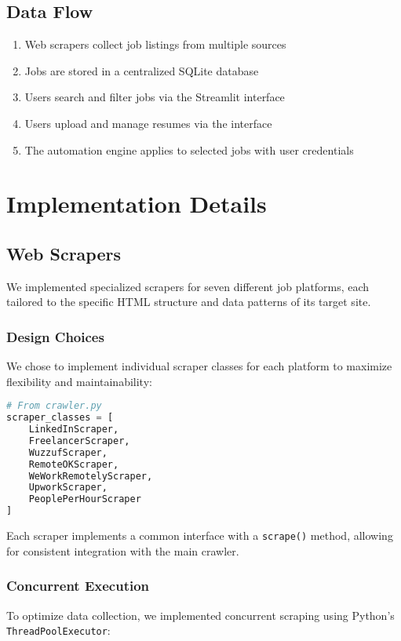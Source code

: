 \documentclass[12pt,a4paper]{report}
\begin{document}
\section{Data Flow}
\begin{enumerate}
    \item Web scrapers collect job listings from multiple sources
    \item Jobs are stored in a centralized SQLite database
    \item Users search and filter jobs via the Streamlit interface
    \item Users upload and manage resumes via the interface
    \item The automation engine applies to selected jobs with user credentials
\end{enumerate}

\chapter{Implementation Details}

\section{Web Scrapers}
We implemented specialized scrapers for seven different job platforms, each tailored to the specific HTML structure and data patterns of its target site.

\subsection{Design Choices}
We chose to implement individual scraper classes for each platform to maximize flexibility and maintainability:

\begin{lstlisting}[language=Python, caption=Scraper Class Structure]
# From crawler.py
scraper_classes = [
    LinkedInScraper,
    FreelancerScraper,
    WuzzufScraper,
    RemoteOKScraper,
    WeWorkRemotelyScraper,
    UpworkScraper,
    PeoplePerHourScraper
]
\end{lstlisting}

Each scraper implements a common interface with a \texttt{scrape()} method, allowing for consistent integration with the main crawler.

\subsection{Concurrent Execution}
To optimize data collection, we implemented concurrent scraping using Python's \texttt{ThreadPoolExecutor}:
\end{document}
